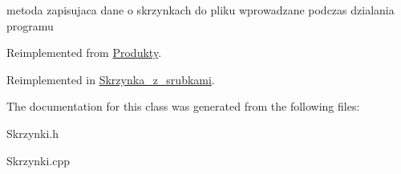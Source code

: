 metoda zapisujaca dane o skrzynkach do pliku wprowadzane podczas dzialania programu 

Reimplemented from \mbox{\hyperlink{class_produkty_a49c2ba4084346df8e7c987b9ec62676e}{Produkty}}.



Reimplemented in \mbox{\hyperlink{class_skrzynka__z__srubkami_a62ccdf02cb9d364630ebea27ea94f2a3}{Skrzynka\+\_\+z\+\_\+srubkami}}.



The documentation for this class was generated from the following files\+:\begin{DoxyCompactItemize}
\item 
Skrzynki.\+h\item 
Skrzynki.\+cpp\end{DoxyCompactItemize}
